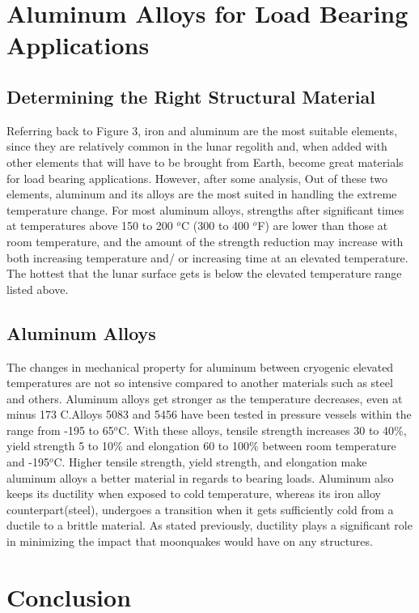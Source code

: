 \documentclass{aa}
\begin{document}
\section {Aluminum Alloys for Load Bearing Applications}
\subsection{Determining the Right Structural Material}
 Referring back to Figure 3, iron and aluminum are the most suitable elements, since they are relatively common in the lunar regolith and, when added with other elements that will have to be brought from Earth, become great materials for load bearing applications. However, after some analysis,   Out of these two elements, aluminum and its alloys are the most suited in handling the extreme temperature change.  For most aluminum alloys, strengths after significant times at temperatures above 150 to 200 $^o$C (300 to 400 $^o$F) are lower than those at room temperature, and the amount of the strength reduction may increase with both increasing temperature and/ or increasing time at an elevated temperature. The hottest that the lunar surface gets is below the elevated temperature range listed above. 
\subsection{Aluminum Alloys}
The changes in mechanical property for aluminum between cryogenic elevated temperatures are not so intensive compared to another materials such as steel and others. Aluminum alloys get stronger as the temperature decreases, even at minus 173 C.Alloys 5083 and 5456 have been tested in pressure vessels within the range from -195 to 65$^o$C. With these alloys, tensile strength increases 30 to 40\%, yield strength 5 to 10\% and elongation 60 to 100\% between room temperature and -195$^o$C. Higher tensile strength, yield strength, and elongation make aluminum alloys a better material in regards to bearing loads. Aluminum also keeps its ductility when exposed to cold temperature, whereas its iron alloy counterpart(steel), undergoes a transition when it gets sufficiently cold from a ductile to a brittle material. As stated previously, ductility plays a significant role in minimizing the impact that moonquakes would have on any structures.


\section{Conclusion}
\end{document}
